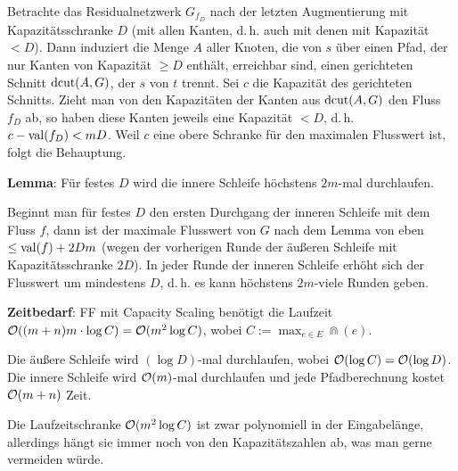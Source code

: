 \begin{Beweis}
    Betrachte das Residualnetzwerk $G_{f_D}$
    nach der letzten Augmentierung mit Kapazitätsschranke $D$
    (mit allen Kanten, d.\,h. auch mit denen mit Kapazität $< D$).
    Dann induziert die Menge $A$ aller Knoten, die von $s$ über einen Pfad,
    der nur Kanten von Kapazität $\ge D$ enthält, erreichbar sind, einen gerichteten Schnitt
    $\operatorname{dcut}(A, G)$, der $s$ von $t$ trennt.
    Sei $c$ die Kapazität des gerichteten Schnitts.
    Zieht man von den Kapazitäten der Kanten aus $\operatorname{dcut}(A, G)$ den Fluss $f_D$ ab,
    so haben diese Kanten jeweils eine Kapazität $< D$,
    d.\,h. $c - \operatorname{val}(f_D) < mD$.
    Weil $c$ eine obere Schranke für den maximalen Flusswert ist, folgt die Behauptung.
\end{Beweis}

\textbf{Lemma}:
Für festes $D$ wird die innere Schleife höchstens $2m$-mal durchlaufen.

\begin{Beweis}
    Beginnt man für festes $D$ den ersten Durchgang der inneren Schleife mit dem Fluss $f$,
    dann ist der maximale Flusswert von $G$ nach dem Lemma von eben $\le \operatorname{val}(f) + 2Dm$
    (wegen der vorherigen Runde der äußeren Schleife mit Kapazitätsschranke $2D$).
    In jeder Runde der inneren Schleife erhöht sich der Flusswert um mindestens $D$,
    d.\,h. es kann höchstens $2m$-viele Runden geben.
\end{Beweis}

\textbf{Zeitbedarf}:
FF mit Capacity Scaling benötigt die Laufzeit $\mathcal{O}((m + n)m \cdot \log C) = \mathcal{O}(m^2 \log C)$,
wobei $C := \max_{e \in E} \Cap(e)$.

\begin{Beweis}
    Die äußere Schleife wird $(\log D)$-mal durchlaufen, wobei $\mathcal{O}(\log C) = \mathcal{O}(\log D)$.
    Die innere Schleife wird $\mathcal{O}(m)$-mal durchlaufen und jede Pfadberechnung kostet
    $\mathcal{O}(m + n)$ Zeit.
\end{Beweis}

Die Laufzeitschranke $\mathcal{O}(m^2 \log C)$ ist zwar polynomiell in der Eingabelänge, allerdings hängt
sie immer noch von den Kapazitätszahlen ab, was man gerne vermeiden würde.

\pagebreak

